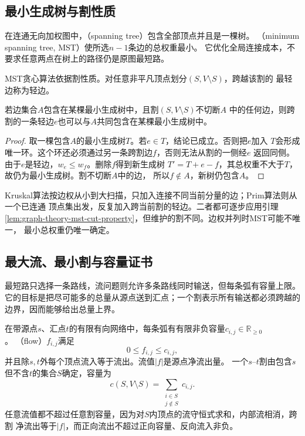 \subsection{最小生成树与割性质}

在连通无向加权图中，（spanning tree）包含全部顶点并且是一棵树。
（minimum spanning tree, MST）使所选\(n-1\)条边的总权重最小。
它优化全局连接成本，不要求任意两点在树上的路径仍是原图最短路。

MST贪心算法依据割性质。对任意非平凡顶点划分\((S,V\setminus S)\)，跨越该割的
最轻边称为轻边。
\begin{lemma}[最小生成树的割性质]
  \label{lem:graph-theory-mst-cut-property}
  若边集合\(A\)包含在某棵最小生成树中，且割\((S,V\setminus S)\)不切断\(A\)
  中的任何边，则跨割的一条轻边\(e\)也可以与\(A\)共同包含在某棵最小生成树中。
\end{lemma}

\begin{proof}
取一棵包含\(A\)的最小生成树\(T\)。若\(e\in T\)，结论已成立。否则把\(e\)加入
\(T\)会形成唯一环。这个环还必须通过另一条跨割边\(f\)，否则无法从割的一侧经\(e\)
返回同侧。由于\(e\)是轻边，\(w_e\leq w_f\)。删除\(f\)得到新生成树
\(T'=T+e-f\)，其总权重不大于\(T\)，故仍为最小生成树。割不切断\(A\)中的边，
所以\(f\notin A\)，新树仍包含\(A\)。
\end{proof}

Kruskal算法按边权从小到大扫描，只加入连接不同当前分量的边；Prim算法则从一个已连通
顶点集出发，反复加入跨当前割的轻边。二者都可逐步应用引理
\ref{lem:graph-theory-mst-cut-property}，但维护的割不同。边权并列时MST可能不唯一，
最小总权重仍唯一确定。

\subsection{最大流、最小割与容量证书}

最短路只选择一条路线，流问题则允许多条路线同时输送，但每条弧有容量上限。
它的目标是把尽可能多的总量从源点送到汇点；一个割表示所有输送都必须跨越的边界，因而能够给出总量上界。

在带源点\(s\)、汇点\(t\)的有限有向网络中，每条弧有有限非负容量\(c_{i,j}\in\mathbb R_{\geq0}\)。
（flow）\(f_{i,j}\)满足
\[
  0\leq f_{i,j}\leq c_{i,j},
\]
并且除\(s,t\)外每个顶点流入等于流出。流值\(|f|\)是源点净流出量。
一个\(s\)--\(t\)割由包含\(s\)但不含\(t\)的集合\(S\)确定，容量为
\[
  c(S,V\setminus S)=
  \sum_{\substack{i\in S\\j\notin S}}c_{i,j}.
\]
任意流值都不超过任意割容量，因为对\(S\)内顶点的流守恒式求和，内部流相消，跨割
净流出等于\(|f|\)，而正向流出不超过正向容量、反向流入非负。

